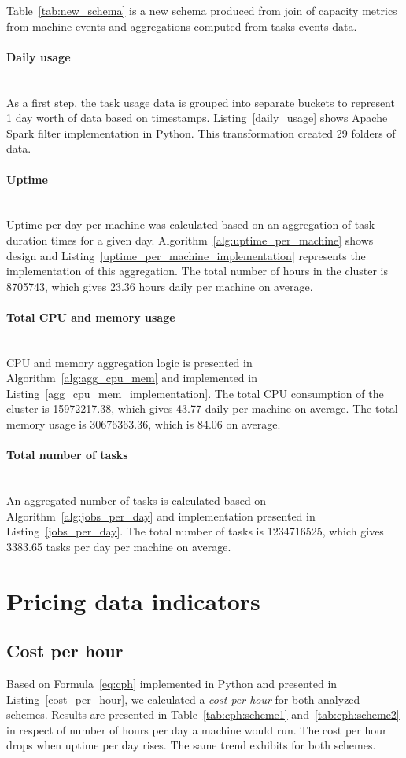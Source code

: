 \documentclass[]{final_report}
\newcommand{\myparagraph}[1]{\paragraph{#1}\mbox{}\\}
\begin{document}
Table~\ref{tab:new_schema} is a new schema produced from join of capacity metrics from machine events and aggregations computed from tasks events data. 

\myparagraph{Daily usage}
As a first step, the task usage data is grouped into separate buckets to represent 1 day worth of data based on timestamps. Listing~\ref{daily_usage} shows Apache Spark filter implementation in Python. This transformation created 29 folders of data.

\myparagraph{Uptime}
Uptime per day per machine was calculated based on an aggregation of task duration times for a given day. Algorithm~\ref{alg:uptime_per_machine} shows design and Listing~\ref{uptime_per_machine_implementation} represents the implementation of this aggregation. The total number of hours in the cluster is 8705743, which gives 23.36 hours daily per machine on average. 

\myparagraph{Total CPU and memory usage}
CPU and memory aggregation logic is presented in Algorithm~\ref{alg:agg_cpu_mem} and implemented in Listing~\ref{agg_cpu_mem_implementation}. The total CPU consumption of the cluster is 15972217.38, which gives 43.77 daily per machine on average. The total memory usage is 30676363.36, which is 84.06 on average. 

\myparagraph{Total number of tasks}
An aggregated number of tasks is calculated based on Algorithm~\ref{alg:jobs_per_day} and implementation presented in Listing~\ref{jobs_per_day}. The total number of tasks is 1234716525, which gives 3383.65 tasks per day per machine on average.


\section{Pricing data indicators}

\subsection{Cost per hour}

Based on Formula~\ref{eq:cph} implemented in Python and presented in Listing~\ref{cost_per_hour}, we calculated a \textit{cost per hour} for both analyzed schemes. Results are presented in Table~\ref{tab:cph:scheme1} and~\ref{tab:cph:scheme2} in respect of number of hours per day a machine would run. The cost per hour drops when uptime per day rises. The same trend exhibits for both schemes.
\end{document}
